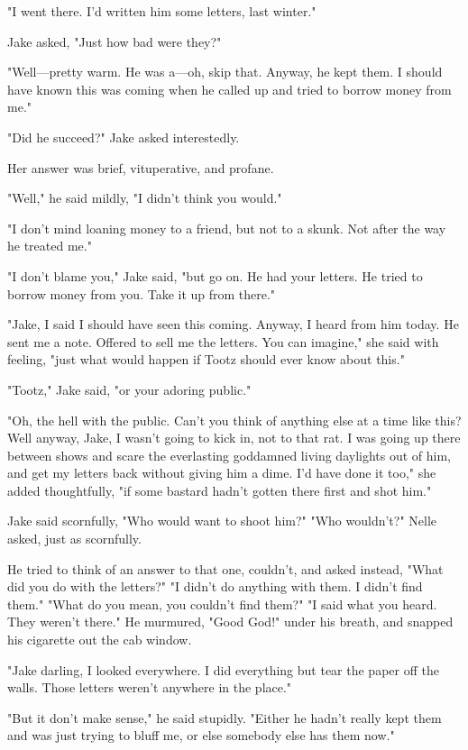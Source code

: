 \documentclass{novel}
\begin{document}
"I went there. I'd written him some letters, last winter."

Jake asked, "Just how bad were they?"

"Well—pretty warm. He was a—oh, skip that. Anyway, he kept them. I should have known this was coming when he called up and tried to borrow money from me."

"Did he succeed?" Jake asked interestedly.

Her answer was brief, vituperative, and profane.

"Well," he said mildly, "I didn't think you would."

"I don't mind loaning money to a friend, but not to a skunk. Not after the way he treated me."

"I don't blame you," Jake said, "but go on. He had your letters. He tried to borrow money from you. Take it up from there."

"Jake, I said I should have seen this coming. Anyway, I heard from him today. He sent me a note. Offered to sell me the letters. You can imagine," she said with feeling, "just what would happen if Tootz should ever know about this."

"Tootz," Jake said, "or your adoring public."

"Oh, the hell with the public. Can't you think of anything else at a time like this? Well anyway, Jake, I wasn't going to kick in, not to that rat. I was going up there between shows and scare the everlasting goddamned living daylights out of him, and get my letters back without giving him a dime. I'd have done it too," she added thoughtfully, "if some bastard hadn't gotten there first and shot him."

Jake said scornfully, "Who would want to shoot him?" "Who wouldn't?" Nelle asked, just as scornfully.

He tried to think of an answer to that one, couldn't, and asked instead, "What did you do with the letters?" "I didn't do anything with them. I didn't find them." "What do you mean, you couldn't find them?" "I said what you heard. They weren't there." He murmured, "Good God!" under his breath, and snapped his cigarette out the cab window.

"Jake darling, I looked everywhere. I did everything but tear the paper off the walls. Those letters weren't anywhere in the place."

"But it don't make sense," he said stupidly. "Either he hadn't really kept them and was just trying to bluff me, or else somebody else has them now."
\end{document}
